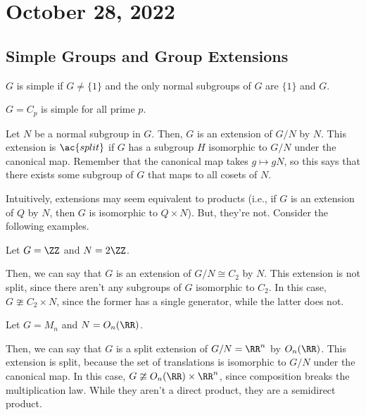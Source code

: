 \section{October 28, 2022}

\subsection{Simple Groups and Group Extensions}

\begin{definition}

$G$ is \ac{simple} if $G\neq \{1\}$ and the only normal subgroups of $G$ are $\{1\}$ and $G$.
\end{definition}

\begin{example}
\exlabel

$G = C_p$ is simple for all prime $p$.
\end{example}

\begin{definition}

Let $N$ be a normal subgroup in $G$. Then, $G$ is an \ac{extension} of $G/N$ by $N$. This extension is $\ac{split}$ if $G$ has a subgroup $H$ isomorphic to $G/N$ under the canonical map. Remember that the canonical map takes $g\mapsto gN$, so this says that there exists some subgroup of $G$ that maps to all cosets of $N$.
\end{definition}

Intuitively, extensions may seem equivalent to products (i.e., if $G$ is an extension of $Q$ by $N$, then $G$ is isomorphic to $Q\times N$). But, they're not. Consider the following examples. 

\begin{example}
\exlabel

Let $G = \ZZ$ and $N = 2\ZZ$. 
\end{example}
Then, we can say that $G$ is an extension of $G/N \cong C_2$ by $N$. This extension is not split, since there aren't any subgroups of $G$ isomorphic to $C_2$. In this case, $G \ncong C_2\times N$, since the former has a single generator, while the latter does not.

\begin{example}
\exlabel

Let $G = M_n$ and $N = O_n(\RR)$. 
\end{example}

Then, we can say that $G$ is a split extension of $G/N = \RR^n$ by $O_n(\RR)$. This extension is split, because the set of translations is isomorphic to $G/N$ under the canonical map. In this case, $G\ncong O_n(\RR)\times \RR^n$, since composition breaks the multiplication law. While they aren't a direct product, they are a \ac{semidirect product}.  

